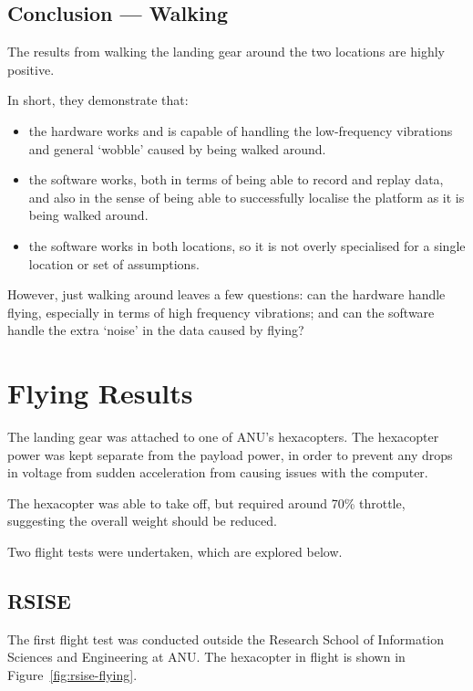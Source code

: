 \documentclass[12pt,oneside,a4paper]{book}
\begin{document}
\subsection{Conclusion --- Walking}
\label{sec:concl-walk-only}

The results from walking the landing gear around the two locations are
highly positive.

In short, they demonstrate that:
\begin{itemize}
\item  the hardware works and is capable of
handling the low-frequency vibrations and general `wobble' caused by
being walked around.
\item the software works, both in terms of being able to record and
  replay data, and also in the sense of being able to successfully
  localise the platform as it is being walked around.
\item the software works in both locations, so it is not overly
  specialised for a single location or set of assumptions.
\end{itemize}

However, just walking around leaves a few questions: can the hardware
handle flying, especially in terms of high frequency vibrations; and
can the software handle the extra `noise' in the data caused by flying?
\newpage
\section{Flying Results}
\label{sec:flying}

The landing gear was attached to one of ANU's hexacopters. The
hexacopter power was kept separate from the payload power, in order to
prevent any drops in voltage from sudden acceleration from causing
issues with the computer.

The hexacopter was able to take off, but required around 70\%
throttle, suggesting the overall weight should be reduced.

Two flight tests were undertaken, which are explored below.

\subsection{RSISE}
\label{sec:rsise}

The first flight test was conducted outside the Research School of
Information Sciences and Engineering at ANU. The hexacopter in flight is
shown in Figure~\ref{fig:rsise-flying}.
\end{document}
